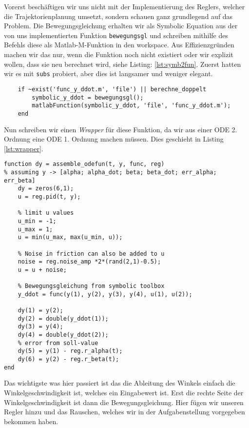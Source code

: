Vorerst beschäftigen wir uns nicht mit der Implementierung des Reglers, welcher die Trajektorienplanung umsetzt, sondern schauen ganz grundlegend auf das Problem. Die Bewegungsgleichung erhalten wir als Symbolic Equation aus der von uns implementierten Funktion \texttt{bewegungsgl} und schreiben mithilfe des Befehls diese als Matlab-M-Funktion in den workspace. Aus Effizienzgründen machen wir das nur, wenn die Funktion noch nicht existiert oder wir explizit wollen, dass sie neu berechnet wird, siehe Listing: \ref{lst:symb2fun}. Zuerst hatten wir es mit \texttt{subs} probiert, aber dies ist langsamer und weniger elegant.


\begin{lstlisting}[caption={Aufruf der Funktion \texttt{ode45}},label={lst:symb2fun}]
    %% Bewegungsgleichung
    if ~exist('func_y_ddot.m', 'file') || berechne_doppelt
        symbolic_y_ddot = bewegungsgl();
        matlabFunction(symbolic_y_ddot, 'file', 'func_y_ddot.m');
    end
\end{lstlisting}

Nun schreiben wir einen \textit{Wrapper} für diese Funktion, da wir aus einer ODE 2. Ordnung eine ODE 1. Ordnung machen müssen. Dies geschieht in Listing \ref{lst:wrapper}. 

\begin{lstlisting}[caption={Definition der rechten Seite},label={lst:wrapper}]
function dy = assemble_odefun(t, y, func, reg)
% assuming y -> [alpha; alpha_dot; beta; beta_dot; err_alpha; err_beta]
    dy = zeros(6,1);
    u = reg.pid(t, y);
    
    % limit u values
    u_min = -1;
    u_max = 1;
    u = min(u_max, max(u_min, u));

    % Noise in friction can also be added to u
    noise = reg.noise_amp *2*(rand(2,1)-0.5);
    u = u + noise;

    % Bewegungsgleichung from symbolic toolbox
    y_ddot = func(y(1), y(2), y(3), y(4), u(1), u(2));

    dy(1) = y(2);
    dy(2) = double(y_ddot(1));
    dy(3) = y(4);
    dy(4) = double(y_ddot(2));
    % error from soll-value
    dy(5) = y(1) - reg.r_alpha(t);
    dy(6) = y(2) - reg.r_beta(t);
end
\end{lstlisting}

Das wichtigste was hier passiert ist das die Ableitung des Winkels einfach die Winkelgeschwindigkeit ist, welches ein Eingabewert ist. Erst die rechte Seite der Winkelgeschwindigkeit ist dann die Bewegungsgleichung. Hier fügen wir unseren Regler hinzu und das Rauschen, welches wir in der Aufgabenstellung vorgegeben bekommen haben.


